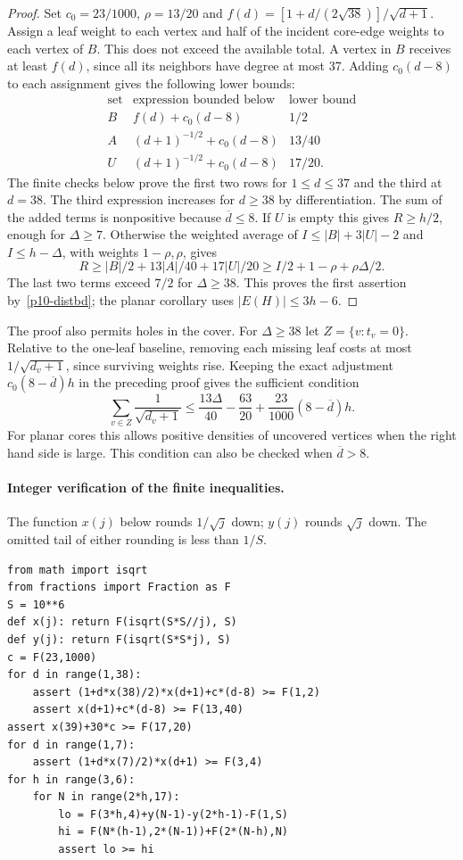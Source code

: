 \documentclass[11pt,a4paper]{article}
\newcommand{\dd}{\overline d}\newcommand{\pos}[1]{(#1)_+}
\begin{document}
\begin{proof}
Set $c_0=23/1000$, $\rho=13/20$ and
$f(d)=[1+d/(2\sqrt{38})]/\sqrt{d+1}$. Assign a leaf weight to each vertex
and half of the incident core-edge weights to each vertex of $B$. This
does not exceed the available total. A vertex in $B$ receives at least
$f(d)$, since all its neighbors have degree at most 37. Adding
$c_0(d-8)$ to each assignment gives the following lower bounds:
\[
 \begin{array}{c|c|c}
   \text{set}&\text{expression bounded below}&\text{lower bound}\\ \hline
   B&f(d)+c_0(d-8)&1/2\\
   A&(d+1)^{-1/2}+c_0(d-8)&13/40\\
   U&(d+1)^{-1/2}+c_0(d-8)&17/20 .
 \end{array}
\]
The finite checks below prove the first two rows for $1\le d\le37$ and
the third at $d=38$. The third expression increases for $d\ge38$ by
differentiation. The sum of the added terms is nonpositive because
$\dd\le8$. If $U$ is empty this gives $R\ge h/2$, enough for $\Delta\ge7$.
Otherwise the weighted average of
$I\le |B|+3|U|-2$ and $I\le h-\Delta$, with weights $1-\rho,\rho$,
gives
\[
 R\ge |B|/2+13|A|/40+17|U|/20
 \ge I/2+1-\rho+\rho\Delta/2 .
\]
The last two terms exceed $7/2$ for $\Delta\ge38$.
This proves the first assertion by~\eqref{p10-distbd}; the planar corollary
uses $|E(H)|\le3h-6$.
\end{proof}
The proof also permits holes in the cover. For $\Delta\ge38$ let
$Z=\{v:t_v=0\}$. Relative to the one-leaf baseline, removing each
missing leaf costs at most $1/\sqrt{d_v+1}$, since surviving weights rise.
Keeping the exact adjustment $c_0(8-\dd)h$ in the preceding proof gives
the sufficient condition
\[
 \sum_{v\in Z}\frac1{\sqrt{d_v+1}}
 \le \frac{13\Delta}{40}-\frac{63}{20}
        +\frac{23}{1000}(8-\dd)h.
\]
For planar cores this allows positive densities of uncovered vertices
when the right hand side is large. This condition can also be checked
when $\dd>8$.

\paragraph{Integer verification of the finite inequalities.}
The function $x(j)$ below rounds $1/\sqrt j$ down; $y(j)$ rounds
$\sqrt j$ down. The omitted tail of either rounding is less than $1/S$.
\begin{verbatim}
from math import isqrt
from fractions import Fraction as F
S = 10**6
def x(j): return F(isqrt(S*S//j), S)
def y(j): return F(isqrt(S*S*j), S)
c = F(23,1000)
for d in range(1,38):
    assert (1+d*x(38)/2)*x(d+1)+c*(d-8) >= F(1,2)
    assert x(d+1)+c*(d-8) >= F(13,40)
assert x(39)+30*c >= F(17,20)
for d in range(1,7):
    assert (1+d*x(7)/2)*x(d+1) >= F(3,4)
for h in range(3,6):
    for N in range(2*h,17):
        lo = F(3*h,4)+y(N-1)-y(2*h-1)-F(1,S)
        hi = F(N*(h-1),2*(N-1))+F(2*(N-h),N)
        assert lo >= hi
\end{verbatim}
\end{document}
